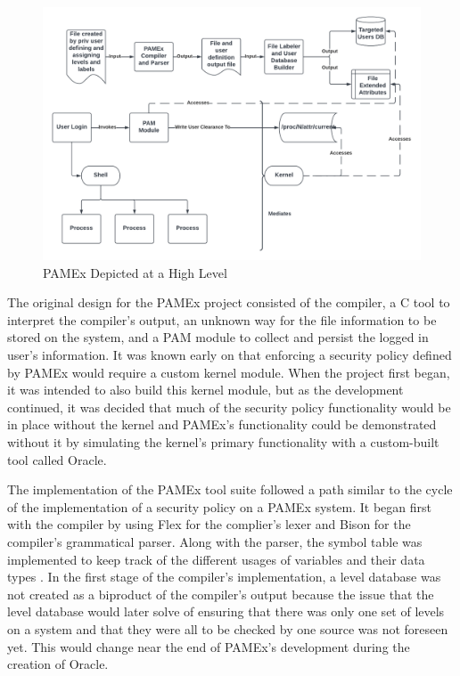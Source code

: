 \begin{figure}[h]
\centering
\includegraphics[width=\textwidth]{section03/assets/capstone-high-level.png}
\caption[PAMEx High Level Flowchart]{\label{Capstone High Level Diagram}PAMEx Depicted at a High Level}
\end{figure}

\vspace{\baselineskip}

The original design for the PAMEx project consisted of the compiler, a 
C tool to interpret the compiler’s output, an unknown way for the file 
information to be stored on the system, and a PAM module to collect and 
persist the logged in user’s information. It was known early on that 
enforcing a security policy defined by PAMEx would require a custom 
kernel module. When the project first began, it was intended to also build this kernel module, but as the 
development continued, it was decided that much of the 
security policy functionality would be in place without the kernel and PAMEx’s functionality 
could be demonstrated without it by simulating the kernel's primary 
functionality with a custom-built tool called Oracle.  

The implementation of the PAMEx tool suite followed a path similar to 
the cycle of the implementation of a security policy on a PAMEx system. 
It began first with the compiler by using Flex for the complier’s lexer 
and Bison for the compiler’s grammatical parser. Along with the parser, 
the symbol table was implemented to keep track of the different usages 
of variables and their data types \cite{levine2009}. In the first stage of the compiler’s 
implementation, a level database was not created as a biproduct of the 
compiler’s output because the issue that the level database would later 
solve of ensuring that there was only one set of levels on a system and 
that they were all to be checked by one source was not foreseen yet. 
This would change near the end of PAMEx’s development during the creation 
of Oracle. 


